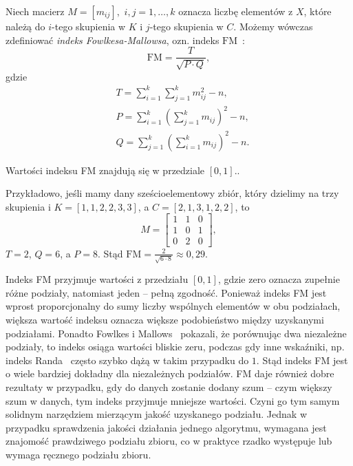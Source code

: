 \documentclass{praca1}
\begin{document}
\begin{definition}
Niech macierz $M = [m_{ij}],$ $i,j = 1,\ldots, k$ oznacza liczbę elementów z $X$, które należą do $i$-tego skupienia w $K$ i $j$-tego skupienia w $C$. Możemy wówczas zdefiniować \emph{indeks Fowlkesa-Mallowsa}, ozn. indeks $\mathrm{FM}$~\cite{Fowlkes1983:fmindex}:
\begin{equation}
\mathrm{FM} = \frac{T}{\sqrt{P\cdot Q}},
\end{equation}
gdzie 
\begin{align*}
& T = \sum\limits_{i=1}^{k}\sum\limits_{j=1}^{k} m_{ij}^2 - n,\\
& P = \sum\limits_{i=1}^{k} (\sum\limits_{j=1}^{k} m_{ij})^2 - n,\\
& Q = \sum\limits_{j=1}^{k} (\sum\limits_{i=1}^{k} m_{ij})^2 - n.
\end{align*}
\end{definition}

Wartości indeksu FM znajdują się w przedziale $[0,1]$..

Przykładowo, jeśli mamy dany sześcioelementowy zbiór, który dzielimy na trzy skupienia i $K = [1, 1, 2, 2, 3, 3]$, a $C = [2, 1, 3, 1, 2, 2]$, to 
$$
M = \begin{bmatrix}
      1 & 1 & 0 \\
      1 & 0 & 1 \\
      0 & 2 & 0
     \end{bmatrix},
$$
$T = 2$, $Q = 6$, a $P = 8$. Stąd $\mathrm{FM} = \frac{2}{\sqrt{6\cdot 8}} \approx 0,29$.

Indeks FM przyjmuje wartości z przedziału $[0,1]$, gdzie zero oznacza zupełnie różne podziały, natomiast jeden -- pełną zgodność. Ponieważ indeks FM jest wprost proporcjonalny do sumy liczby wspólnych elementów w obu podziałach, większa wartość indeksu oznacza większe podobieństwo między uzyskanymi podziałami. Ponadto Fowlkes i Mallows~\cite{Fowlkes1983:fmindex} pokazali, że porównując dwa niezależne podziały, to indeks osiąga wartości bliskie zeru, podczas gdy inne wskaźniki, np. indeks Randa~\cite{Rand1971:objective} często szybko dążą w takim przypadku do $1$. Stąd indeks FM jest o wiele bardziej dokładny dla niezależnych podziałów. FM daje również dobre rezultaty w przypadku, gdy do danych zostanie dodany szum -- czym większy szum w danych, tym indeks przyjmuje mniejsze wartości. Czyni go tym samym solidnym narzędziem mierzącym jakość uzyskanego podziału. 
Jednak w przypadku sprawdzenia jakości działania jednego algorytmu, wymagana jest znajomość prawdziwego podziału zbioru, co w praktyce rzadko występuje lub wymaga ręcznego podziału zbioru.
\end{document}
